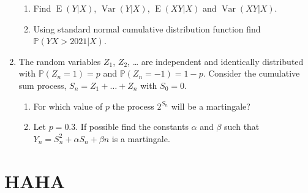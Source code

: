 \documentclass[12pt]{article}
\DeclareMathOperator{\Var}{Var}
\DeclareMathOperator{\E}{E}
\def \P{\mathbb{P}}
\begin{document}
\begin{enumerate}
\begin{enumerate}
  \item Find $\E(Y|X)$, $\Var(Y|X)$, $\E(XY|X)$ and $\Var(XY|X)$.
  \item Using standard normal cumulative distribution function find $\P(YX > 2021 | X)$.
\end{enumerate}


\item The random variables $Z_1$, $Z_2$, \ldots{}  are independent and identically distributed with 
$\P(Z_n = 1) = p$ and $\P(Z_n = -1) = 1-p$. Consider the cumulative sum process, $S_n = Z_1 + \ldots + Z_n$ with $S_0=0$.

\begin{enumerate}
  \item For which value of $p$ the process $2^{S_n}$ will be a martingale?
  \item Let $p=0.3$. 
  If possible find the constants $\alpha$ and $\beta$ such that $Y_n = S_n^2 + \alpha S_n + \beta n$ is a martingale.
\end{enumerate}


\end{enumerate}





\newpage
\section{HAHA}
\end{document}
